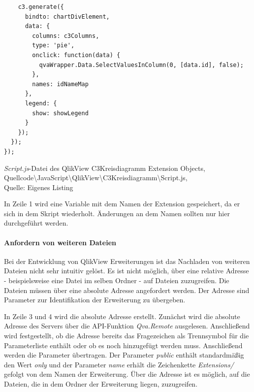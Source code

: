 \begin{listing}[htbp]
\begin{verbatim}
    c3.generate({
      bindto: chartDivElement,
      data: {
        columns: c3Columns,
        type: 'pie',
        onclick: function(data) {
          qvaWrapper.Data.SelectValuesInColumn(0, [data.id], false);
        },
        names: idNameMap
      },
      legend: {
        show: showLegend
      }
    });
  });
});
\end{verbatim}
\caption[\textit{Script.js}-Datei des QlikView C3Kreisdiagramm Extension Objects]{\textit{Script.js}-Datei des QlikView C3Kreisdiagramm Extension Objects, \\Quellcode\textbackslash{}JavaScript\textbackslash{}QlikView\textbackslash{}C3Kreisdiagramm\textbackslash{}Script.js, \\Quelle: Eigenes Listing}
\label{lst:JavascriptC3KreisdiagrammSkript}
\end{listing}\fi



In Zeile 1 wird eine Variable mit dem Namen der Extension gespeichert, da er sich in dem Skript wiederholt. Änderungen an dem Namen sollten nur hier durchgeführt werden.

\paragraph{Anfordern von weiteren Dateien}
\label{lab:QlikViewQvExtAnfordernVonWeiterenDateien} 

Bei der Entwicklung von QlikView Erweiterungen ist das Nachladen von weiteren Dateien nicht sehr intuitiv gelöst. Es ist nicht möglich, über eine relative Adresse - beispielsweise eine Datei im selben Ordner - auf Dateien zuzugreifen. Die Dateien müssen über eine absolute Adresse angefordert werden. Der Adresse sind Parameter zur Identifikation der Erweiterung zu übergeben.

In Zeile 3 und 4 wird die absolute Adresse erstellt. Zunächst wird die absolute Adresse des Servers über die API-Funktion \textit{Qva.Remote} ausgelesen. Anschließend wird festgestellt, ob die Adresse bereits das Fragezeichen als Trennsymbol für die Parameterliste enthält oder ob es noch hinzugefügt werden muss. Anschließend werden die Parameter übertragen. Der Parameter \textit{public} enthält standardmäßig den Wert \textit{only} und der Parameter \textit{name} erhält die Zeichenkette \textit{Extensions/} gefolgt von dem Namen der Erweiterung. Über die Adresse ist es möglich, auf die Dateien, die in dem Ordner der Erweiterung liegen, zuzugreifen.

